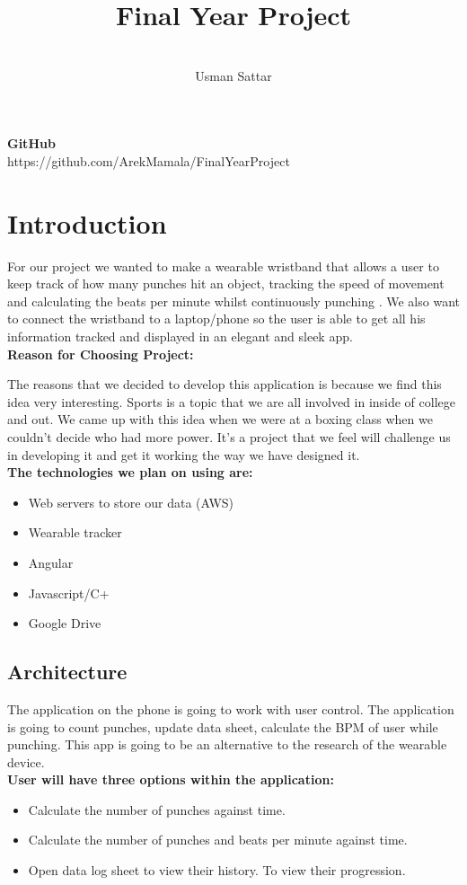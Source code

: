 \documentclass[conference,compsoc]{IEEEtran}
\begin{document}
\title{Final Year Project}
\author{\\{Usman Sattar}\\
}
\maketitle

\textbf{GitHub}
\\
https://github.com/ArekMamala/FinalYearProject

\section{Introduction}
For our project we wanted to make a wearable wristband that allows a user to keep track of how many punches hit an object, tracking the speed of movement and calculating the beats per minute whilst continuously punching . We also want to connect the wristband to a laptop/phone so the user is able to get all his information tracked and displayed in an elegant and sleek app.
\\
\textbf{Reason for Choosing Project:}

The reasons that we decided to develop this application is because we find this idea very interesting. Sports is a topic that we are all involved in inside of college and out. We came up with this idea when we were at a boxing class when we couldn't decide who had more power. It’s a project that we feel will challenge us in developing it and get it working the way we have designed it.
\\
\textbf{The technologies we plan on using are:}
\begin{itemize}
\item{Web servers to store our data (AWS)}
\item{Wearable tracker}
\item{Angular}
\item{Javascript/C+}
\item{Google Drive}
\end{itemize}
\subsection*{Architecture}

The application on the phone is going to work with user control. The application is going to count punches, update data sheet, calculate the BPM of user while punching. This app is going to be an alternative to the research of the wearable device.
\\
\textbf{User will have three options within the application:}
\begin{itemize}
\item Calculate the number of punches against time.
\item Calculate the number of punches and beats per minute against time.
\item Open data log sheet to view their history. To view their progression.
\end{itemize}
\end{document}
